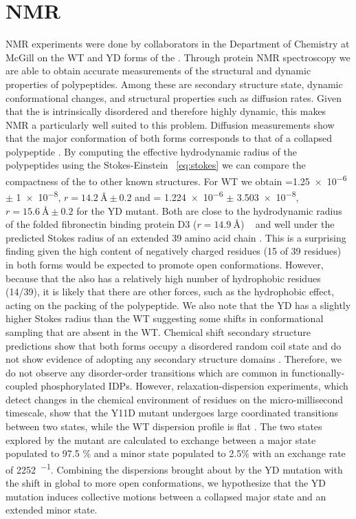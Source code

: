 \section{NMR}

NMR experiments were done by collaborators in the Department of Chemistry at McGill on the WT and YD forms of the \gct. Through protein NMR spectroscopy we are able to obtain accurate \vitro measurements of the structural and dynamic properties of polypeptides. Among these are secondary structure state, dynamic conformational changes, and structural properties such as diffusion rates. Given that the \gct is intrinsically disordered and therefore highly dynamic, this makes NMR a particularly well suited to this problem. Diffusion measurements show that the major conformation of both forms corresponds to that of a collapsed polypeptide . By computing the effective hydrodynamic radius of the polypeptides using the Stokes-Einstein ~\ref{eq:stokes} we can compare the compactness of the \gct to other known structures. For WT we obtain \diffusion=\num{1.25e-6} $\pm$  \SI{1e-8}{\dcunits}, $r = \SI{14.2}{\angstrom} \pm 0.2$ and \diffusion= \num{1.224e-6} $\pm$ \SI{3.503e-8}{\dcunits}, $r = \SI{15.6}{\angstrom} \pm 0.2$ for the YD mutant. Both are close to the hydrodynamic radius of the folded fibronectin binding protein D3 ($r = \SI{14.9}{\angstrom}$) ~\cite{wilkins1999hydrodynamic} and well under the predicted Stokes radius of an extended 39 amino acid chain . This is a surprising finding given the high content of negatively charged residues (15 of 39 residues) in both forms would be expected to promote open conformations. However, because that the \gct also has a relatively high number of hydrophobic residues (14/39), it is likely that there are other forces, such as the hydrophobic effect, acting on the packing of the polypeptide. We also note that the YD has a slightly higher Stokes radius than the WT suggesting some shifts in conformational sampling that are absent in the WT. Chemical shift secondary structure predictions show that both forms occupy a disordered random coil state and do not show evidence of adopting any secondary structure domains . Therefore, we do not observe any disorder-order transitions which are common in functionally-coupled phosphorylated IDPs. However, relaxation-dispersion experiments, which detect changes in the chemical environment of residues on the micro-millisecond timescale, show that the Y11D mutant undergoes large coordinated transitions between two states, while the WT dispersion profile is flat . The two states explored by the mutant are calculated to exchange between a major state populated to 97.5 \% and a minor state populated to 2.5\% with an exchange rate of \SI{2252}{\sec^{-1}}. Combining the dispersions brought about by the YD mutation with the shift in global \diffusion to more open conformations, we hypothesize that the YD mutation induces collective motions between a collapsed major state and an extended minor state. 

